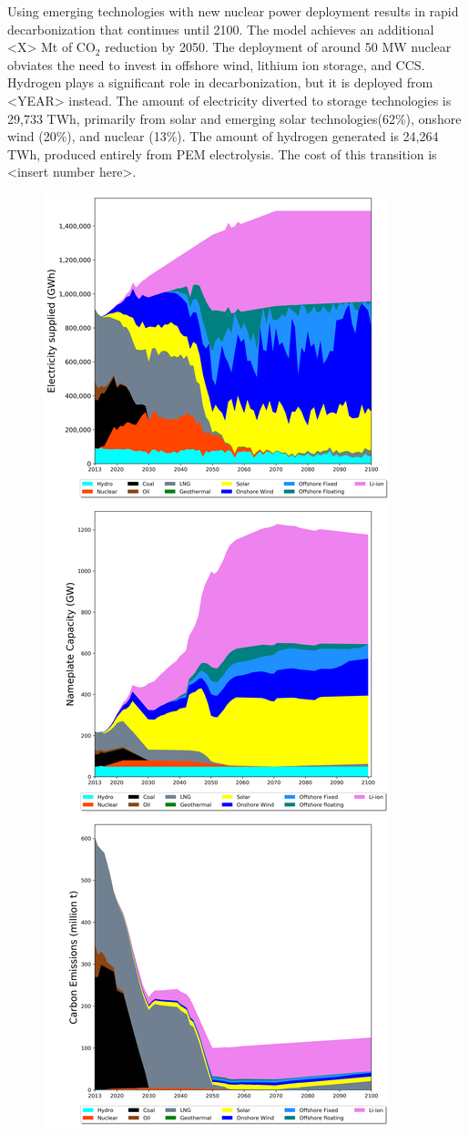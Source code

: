 Using emerging technologies with new nuclear power deployment results in rapid decarbonization that continues until 2100. The model achieves an additional <X> Mt of CO$_2$ reduction by 2050. The deployment of around 50 MW nuclear obviates the need to invest in offshore wind, lithium ion storage, and \gls{CCS}. Hydrogen plays a significant role in decarbonization, but it is deployed from <YEAR> instead. The amount of electricity diverted to storage technologies is 29,733 TWh, primarily from solar and emerging solar technologies(62\%), onshore wind (20\%), and nuclear (13\%). The amount of hydrogen generated is 24,264 TWh, produced entirely from PEM electrolysis. The cost of this transition is <insert number here>.

\begin{figure}[htb] 
\centering
\label{scen1}
\includegraphics[scale=0.3]{figures/conv_nonuc}

\end{figure}
